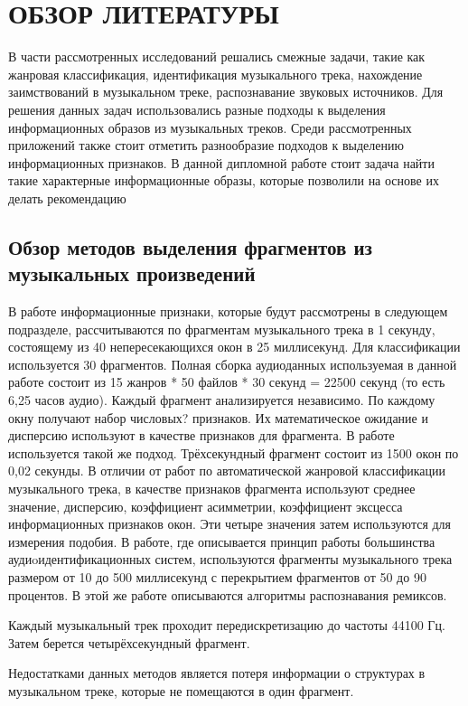 \section{ОБЗОР ЛИТЕРАТУРЫ}
\label{sec:domain}
В части рассмотренных исследований решались смежные задачи, такие как жанровая классификация, идентификация музыкального трека, нахождение заимствований в музыкальном треке, распознавание  звуковых источников. Для решения данных задач использовались разные подходы к выделения информационных образов из музыкальных треков. Среди рассмотренных приложений также стоит отметить разнообразие подходов к выделению информационных признаков. В данной дипломной работе стоит задача найти такие характерные информационные образы, которые позволили на основе их делать рекомендацию
\subsection{Обзор методов выделения фрагментов из музыкальных произведений}
\label{sub:domain:overview_framing}
В работе\cite{src1}  информационные признаки, которые будут рассмотрены в следующем подразделе,  рассчитываются по фрагментам музыкального трека в 1 секунду, состоящему из 40 непересекающихся окон в  25 миллисекунд.  Для классификации используется 30 фрагментов. Полная сборка аудиоданных используемая в данной работе  состоит из 15 жанров * 50 файлов * 30 секунд = 22500 секунд (то есть 6,25 часов аудио). Каждый фрагмент  анализируется независимо. По каждому окну получают набор числовых? признаков. Их математическое ожидание и дисперсию используют в качестве признаков для фрагмента. В работе\cite{src2} используется такой же подход. Трёхсекундный фрагмент состоит из 1500 окон по 0,02 секунды. В отличии от работ\cite{src1} по автоматической жанровой классификации музыкального трека, в качестве признаков фрагмента используют  среднее значение, дисперсию, коэффициент асимметрии, коэффициент эксцесса информационных признаков окон. Эти четыре значения затем используются для измерения подобия. В работе\cite{src4}, где описывается принцип работы большинства аудиoидентификационных систем, используются фрагменты музыкального трека размером от 10 до 500 миллисекунд с перекрытием фрагментов от 50 до 90 процентов. В этой же работе описываются алгоритмы распознавания ремиксов. 

Каждый музыкальный трек проходит передискретизацию до частоты 44100 Гц. Затем берется  четырёхсекундный фрагмент.

Недостатками данных методов является потеря информации о структурах в музыкальном треке, которые не помещаются в один фрагмент.

